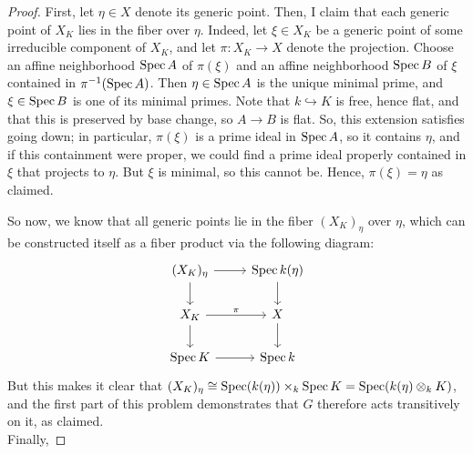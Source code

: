 \begin{proof}
	First, let $\eta \in X$ denote its generic point. Then, I claim that each generic point of $X_K$ lies in the fiber over $\eta$. Indeed, let $\xi \in X_K$ be a generic point of some irreducible component of $X_K$, and let $\pi : X_K \to X$ denote the projection. Choose an affine neighborhood $\operatorname{Spec} A$ of $\pi(\xi)$ and an affine neighborhood $\operatorname{Spec} B$ of $\xi$ contained in $\pi^{-1}(\operatorname{Spec} A)$. Then $\eta \in \operatorname{Spec} A$ is the unique minimal prime, and $\xi \in \operatorname{Spec} B$ is one of its minimal primes. Note that $k \hookrightarrow K$ is free, hence flat, and that this is preserved by base change, so $A \to B$ is flat. So, this extension satisfies going down; in particular, $\pi(\xi)$ is a prime ideal in $\operatorname{Spec} A$, so it contains $\eta$, and if this containment were proper, we could find a prime ideal properly contained in $\xi$ that projects to $\eta$. But $\xi$ is minimal, so this cannot be. Hence, $\pi(\xi) = \eta$ as claimed.
	
	So now, we know that all generic points lie in the fiber $(X_K)_\eta$ over $\eta$, which can be constructed itself as a fiber product via the following diagram:
	\[ \begin{tikzcd} (X_K)_\eta \arrow[r] \arrow[d] & \Spec k(\eta) \arrow[d] \\ X_K \arrow[r,"\pi"] \arrow[d] & X \arrow[d] \\ \Spec K \arrow[r] & \Spec k \end{tikzcd} \]
	But this makes it clear that $(X_K)_\eta \cong \operatorname{Spec}(k(\eta)) \times_k \operatorname{Spec} K = \operatorname{Spec}(k(\eta) \otimes_k K)$, and the first part of this problem demonstrates that $G$ therefore acts transitively on it, as claimed. \\
	
	Finally,
\end{proof}
